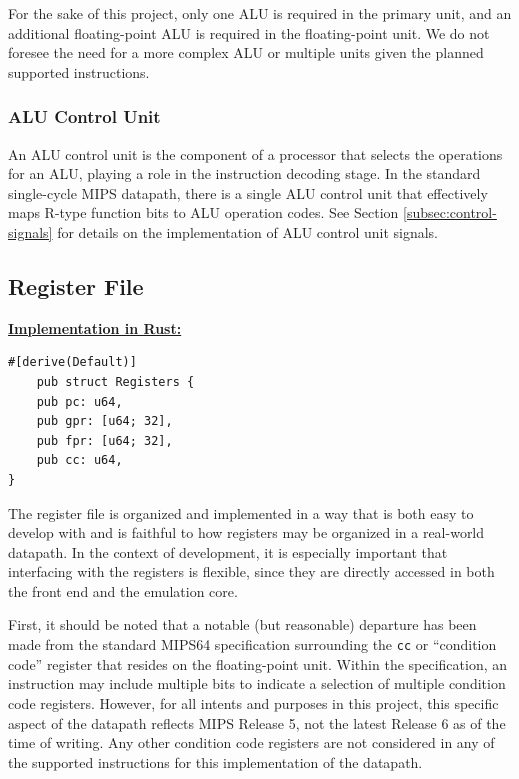 \documentclass[
    paper=letter,
    parskip=half,
    fontsize=12pt,
    titlepage=firstiscover,
    toc=bibliography,
    numbers=endperiod
]{scrartcl}
\begin{document}
For the sake of this project, only one ALU is required in the primary
unit, and an additional floating-point ALU is required in the
floating-point unit. We do not foresee the need for a more complex ALU
or multiple units given the planned supported instructions.

\subsubsection{ALU Control Unit}

An ALU control unit is the component of a processor that selects the
operations for an ALU, playing a role in the instruction decoding stage.
In the standard single-cycle MIPS datapath, there is a single ALU
control unit that effectively maps R-type function bits to ALU operation
codes. See Section \ref{subsec:control-signals} for details on the
implementation of ALU control unit signals.

\subsection{Register File}

\underline{\textbf{Implementation in Rust:}}
\begin{verbatim}
#[derive(Default)]
    pub struct Registers {
    pub pc: u64,
    pub gpr: [u64; 32],
    pub fpr: [u64; 32],
    pub cc: u64,
}
\end{verbatim}

The register file is organized and implemented in a way that is both
easy to develop with and is faithful to how registers may be organized
in a real-world datapath. In the context of development, it is
especially important that interfacing with the registers is flexible,
since they are directly accessed in both the front end and the emulation
core.

First, it should be noted that a notable (but reasonable) departure has
been made from the standard MIPS64 specification surrounding the
\texttt{cc} or ``condition code'' register that resides on the
floating-point unit. Within the specification, an instruction may
include multiple bits to indicate a selection of multiple condition code
registers. However, for all intents and purposes in this project, this
specific aspect of the datapath reflects MIPS Release 5, not the latest
Release 6 as of the time of writing. Any other condition code registers
are not considered in any of the supported instructions for this
implementation of the datapath.
\end{document}
